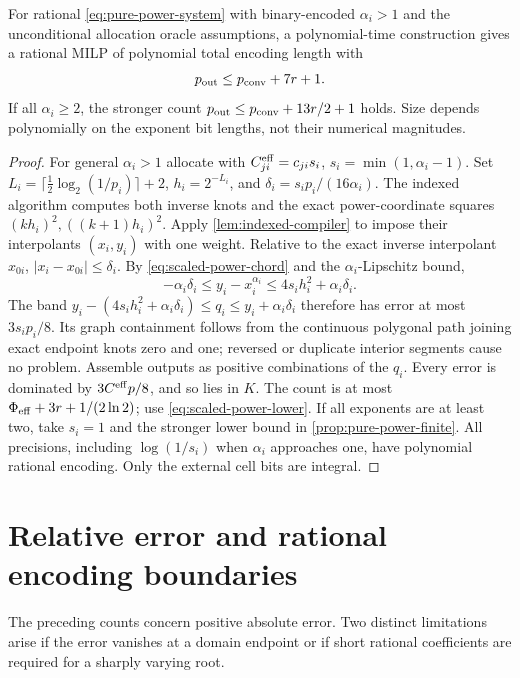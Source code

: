 \begin{theorem}\label{thm:rational-powers}
For rational \eqref{eq:pure-power-system} with binary-encoded
$\alpha_i>1$ and the unconditional allocation oracle assumptions,
a polynomial-time construction gives a rational MILP of polynomial
total encoding length with
\begin{equation}\label{eq:rational-power-count}
 p_{\mathrm{out}}\le p_{\mathrm{conv}}+7r+1.
\end{equation}
If all $\alpha_i\ge2$, the stronger count
$p_{\mathrm{out}}\le p_{\mathrm{conv}}+13r/2+1$ holds. Size depends polynomially on the
exponent bit lengths, not their numerical magnitudes.
\end{theorem}
\begin{proof}
For general $\alpha_i>1$ allocate with $C^{\rm eff}_{ji}=c_{ji}s_i$,
$s_i=\min(1,\alpha_i-1)$. Set
$L_i=\lceil\frac12\log_2(1/p_i)\rceil+2$,
$h_i=2^{-L_i}$, and $\delta_i=s_ip_i/(16\alpha_i)$.
The indexed algorithm computes both inverse knots and the exact
power-coordinate squares $(kh_i)^2,((k+1)h_i)^2$. Apply
\cref{lem:indexed-compiler} to impose their interpolants $(x_i,y_i)$
with one weight. Relative to the exact inverse interpolant $x_{0i}$,
$|x_i-x_{0i}|\le\delta_i$. By
\eqref{eq:scaled-power-chord} and the $\alpha_i$-Lipschitz bound,
\[
 -\alpha_i\delta_i\le y_i-x_i^{\alpha_i}
 \le4s_ih_i^2+\alpha_i\delta_i.
\]
The band
$y_i-(4s_ih_i^2+\alpha_i\delta_i)\le q_i
\le y_i+\alpha_i\delta_i$ therefore has error at most
$3s_ip_i/8$. Its graph containment follows from the continuous
polygonal path joining exact endpoint knots zero and one; reversed
or duplicate interior segments cause no problem. Assemble outputs
as positive combinations of the $q_i$. Every error is dominated by
$3C^{\rm eff}p/8$, and so lies in $K$.
The count is at most $\Phi_{\rm eff}+3r+1/(2\ln2)$; use
\eqref{eq:scaled-power-lower}. If all exponents are at least two,
take $s_i=1$ and the stronger lower bound in
\cref{prop:pure-power-finite}. All precisions, including
$\log(1/s_i)$ when $\alpha_i$ approaches one, have polynomial
rational encoding. Only the external cell bits are integral.
\end{proof}

\section{Relative error and rational encoding boundaries}
\label{sec:encoding-boundaries}

The preceding counts concern positive absolute error. Two distinct
limitations arise if the error vanishes at a domain endpoint or if
short rational coefficients are required for a sharply varying root.

